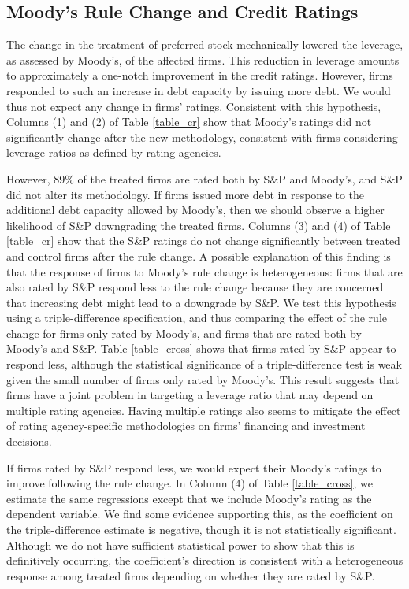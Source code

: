 \documentclass[a4paper, 12pt]{article}
\begin{document}
\subsection{Moody's Rule Change and Credit Ratings}

The change in the treatment of preferred stock mechanically lowered the leverage, as assessed by Moody's, of the affected firms. This reduction in leverage amounts to approximately a one-notch improvement in the credit ratings. However, firms responded to such an increase in debt capacity by issuing more debt. We would thus not expect any change in firms' ratings. Consistent with this hypothesis, Columns (1) and (2) of Table \ref{table_cr} show that Moody's ratings did not significantly change after the new methodology, consistent with firms considering leverage ratios as defined by rating agencies.

However, 89\% of the treated firms are rated both by S\&P and Moody's, and S\&P did not alter its methodology. If firms issued more debt in response to the additional debt capacity allowed by Moody's, then we should observe a higher likelihood of S\&P downgrading the treated firms. Columns (3) and (4) of Table \ref{table_cr} show that the S\&P ratings do not change significantly between treated and control firms after the rule change. A possible explanation of this finding is that the response of firms to Moody's rule change is heterogeneous: firms that are also rated by S\&P respond less to the rule change because they are concerned that increasing debt might lead to a downgrade by S\&P. We test this hypothesis using a triple-difference specification, and thus comparing the effect of the rule change for firms only rated by Moody's, and firms that are rated both by Moody's and S\&P. Table \ref{table_cross} shows that firms rated by S\&P appear to respond less, although the statistical significance of a triple-difference test is weak given the small number of firms only rated by Moody's. This result suggests that firms have a joint problem in targeting a leverage ratio that may depend on multiple rating agencies. Having multiple ratings also seems to mitigate the effect of rating agency-specific methodologies on firms' financing and investment decisions.

If firms rated by S\&P respond less, we would expect their Moody's ratings to improve following the rule change. In Column (4) of Table \ref{table_cross}, we estimate the same regressions except that we include Moody's rating as the dependent variable. We find some evidence supporting this, as the coefficient on the triple-difference estimate is negative, though it is not statistically significant. Although we do not have sufficient statistical power to show that this is definitively occurring, the coefficient's direction is consistent with a heterogeneous response among treated firms depending on whether they are rated by S\&P.
\end{document}
